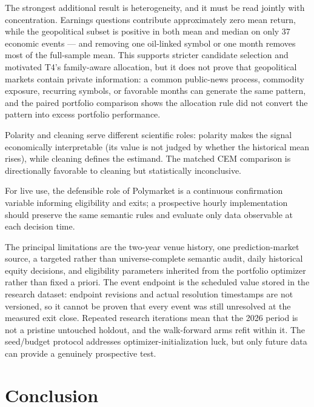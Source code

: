 \documentclass[sigconf,anonymous]{acmart}
\begin{document}
The strongest additional result is heterogeneity, and it must be read jointly with concentration. Earnings questions contribute approximately zero mean return, while the geopolitical subset is positive in both mean and median on only 37 economic events --- and removing one oil-linked symbol or one month removes most of the full-sample mean. This supports stricter candidate selection and motivated T4's family-aware allocation, but it does not prove that geopolitical markets contain private information: a common public-news process, commodity exposure, recurring symbols, or favorable months can generate the same pattern, and the paired portfolio comparison shows the allocation rule did not convert the pattern into excess portfolio performance.

Polarity and cleaning serve different scientific roles: polarity makes the signal economically interpretable (its value is not judged by whether the historical mean rises), while cleaning defines the estimand. The matched CEM comparison is directionally favorable to cleaning but statistically inconclusive.

For live use, the defensible role of Polymarket is a continuous confirmation variable informing eligibility and exits; a prospective hourly implementation should preserve the same semantic rules and evaluate only data observable at each decision time.

The principal limitations are the two-year venue history, one prediction-market source, a targeted rather than universe-complete semantic audit, daily historical equity decisions, and eligibility parameters inherited from the portfolio optimizer rather than fixed a priori. The event endpoint is the scheduled value stored in the research dataset: endpoint revisions and actual resolution timestamps are not versioned, so it cannot be proven that every event was still unresolved at the measured exit close. Repeated research iterations mean that the 2026 period is not a pristine untouched holdout, and the walk-forward arms refit within it. The seed/budget protocol addresses optimizer-initialization luck, but only future data can provide a genuinely prospective test.

\section{Conclusion}
\end{document}
